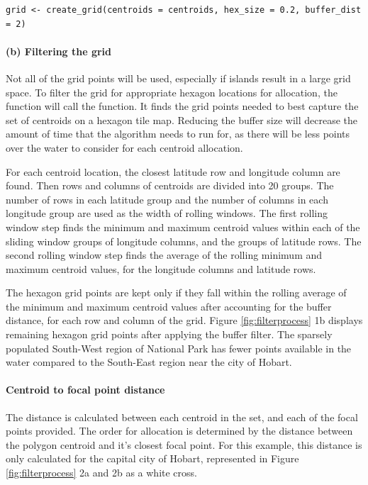 \begin{verbatim}
grid <- create_grid(centroids = centroids, hex_size = 0.2, buffer_dist = 2)
\end{verbatim}

\hypertarget{b-filtering-the-grid}{%
\paragraph{(b) Filtering the grid}\label{b-filtering-the-grid}}

Not all of the grid points will be used, especially if islands result in
a large grid space. To filter the grid for appropriate hexagon locations
for allocation, the  function will call the
 function. It finds the grid points needed to best
capture the set of centroids on a hexagon tile map. Reducing the buffer
size will decrease the amount of time that the algorithm needs to run
for, as there will be less points over the water to consider for each
centroid allocation.

For each centroid location, the closest latitude row and longitude
column are found. Then rows and columns of centroids are divided into 20
groups. The number of rows in each latitude group and the number of
columns in each longitude group are used as the width of rolling
windows. The first rolling window step finds the minimum and maximum
centroid values within each of the sliding window groups of longitude
columns, and the groups of latitude rows. The second rolling window step
finds the average of the rolling minimum and maximum centroid values,
for the longitude columns and latitude rows.

The hexagon grid points are kept only if they fall within the rolling
average of the minimum and maximum centroid values after accounting for
the buffer distance, for each row and column of the grid. Figure
\ref{fig:filterprocess} 1b displays remaining hexagon grid points after
applying the buffer filter. The sparsely populated South-West region of
National Park has fewer points available in the water compared to the
South-East region near the city of Hobart.

\hypertarget{centroid-to-focal-point-distance}{%
\paragraph{Centroid to focal point
distance}\label{centroid-to-focal-point-distance}}

The distance is calculated between each centroid in the set, and each of
the focal points provided. The order for allocation is determined by the
distance between the polygon centroid and it's closest focal point. For
this example, this distance is only calculated for the capital city of
Hobart, represented in Figure \ref{fig:filterprocess} 2a and 2b as a
white cross.

